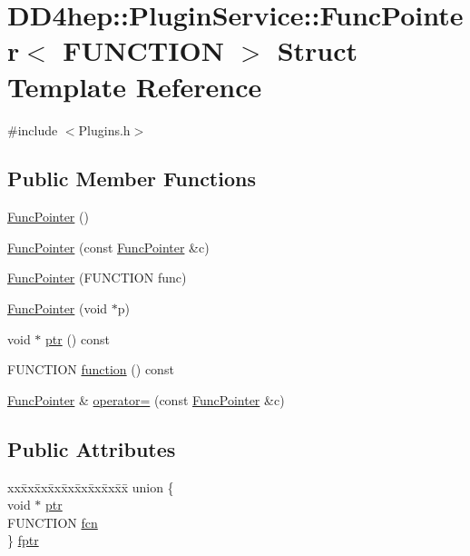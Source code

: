 \hypertarget{struct_d_d4hep_1_1_plugin_service_1_1_func_pointer}{
\section{DD4hep::PluginService::FuncPointer$<$ FUNCTION $>$ Struct Template Reference}
\label{struct_d_d4hep_1_1_plugin_service_1_1_func_pointer}
}


{\ttfamily \#include $<$Plugins.h$>$}\subsection*{Public Member Functions}
\begin{DoxyCompactItemize}
\item 
\hyperlink{struct_d_d4hep_1_1_plugin_service_1_1_func_pointer_ae5956ad0aad6406a1e9f8132ec730814}{FuncPointer} ()
\item 
\hyperlink{struct_d_d4hep_1_1_plugin_service_1_1_func_pointer_ae44e78b875229c095bbb81a40ddd2a30}{FuncPointer} (const \hyperlink{struct_d_d4hep_1_1_plugin_service_1_1_func_pointer}{FuncPointer} \&c)
\item 
\hyperlink{struct_d_d4hep_1_1_plugin_service_1_1_func_pointer_ae945b6d39759becb51d6d37dd05eed6e}{FuncPointer} (FUNCTION func)
\item 
\hyperlink{struct_d_d4hep_1_1_plugin_service_1_1_func_pointer_a42c98ba137676de62b6da889eeff5421}{FuncPointer} (void $\ast$p)
\item 
void $\ast$ \hyperlink{struct_d_d4hep_1_1_plugin_service_1_1_func_pointer_af926d56a3d2d1edb432a1ef92d0dee32}{ptr} () const 
\item 
FUNCTION \hyperlink{struct_d_d4hep_1_1_plugin_service_1_1_func_pointer_a457cb34fac74ed0bfaa9f77905f936af}{function} () const 
\item 
\hyperlink{struct_d_d4hep_1_1_plugin_service_1_1_func_pointer}{FuncPointer} \& \hyperlink{struct_d_d4hep_1_1_plugin_service_1_1_func_pointer_a90ba8c1510a405a5cf21da4625c9e76b}{operator=} (const \hyperlink{struct_d_d4hep_1_1_plugin_service_1_1_func_pointer}{FuncPointer} \&c)
\end{DoxyCompactItemize}
\subsection*{Public Attributes}
\begin{DoxyCompactItemize}
\item 
\begin{tabbing}
xx\=xx\=xx\=xx\=xx\=xx\=xx\=xx\=xx\=\kill
union \{\\
\>void $\ast$ \hyperlink{struct_d_d4hep_1_1_plugin_service_1_1_func_pointer_a2de222ee867b2669e86af39351a05a68}{ptr}\\
\>FUNCTION \hyperlink{struct_d_d4hep_1_1_plugin_service_1_1_func_pointer_a1858e4504eb3117ff82f6c7c418ff386}{fcn}\\
\} \hyperlink{struct_d_d4hep_1_1_plugin_service_1_1_func_pointer_a148afe78c175741c86b0e99e1988562f}{fptr}\\

\end{tabbing}\end{DoxyCompactItemize}


